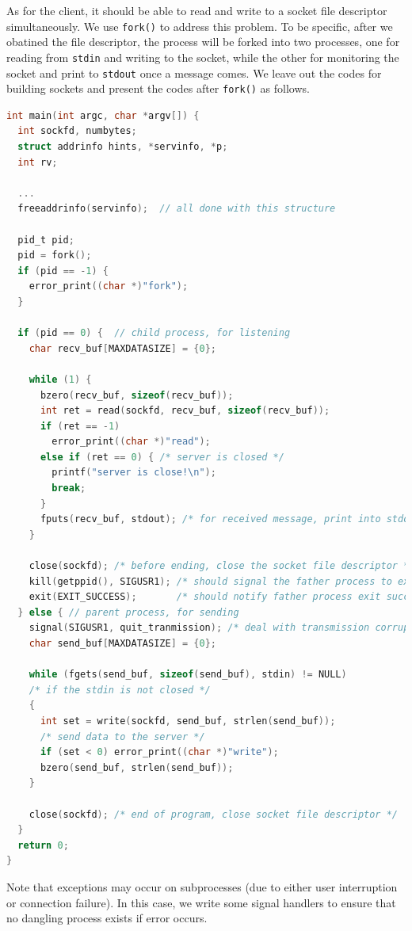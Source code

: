 \begin{exercise}[]
  As for the client, it should be able to read and write to a socket file descriptor simultaneously. We use \texttt{fork()} to address this problem. To be specific, after we obatined the file descriptor, the process will be forked into two processes, one for reading from \texttt{stdin} and writing to the socket, while the other for monitoring the socket and print to \texttt{stdout} once a message comes. We leave out the codes for building sockets and present the codes after \texttt{fork()} as follows.

\begin{lstlisting}[language=C]
int main(int argc, char *argv[]) {
  int sockfd, numbytes;
  struct addrinfo hints, *servinfo, *p;
  int rv;

  ...
  freeaddrinfo(servinfo);  // all done with this structure

  pid_t pid;
  pid = fork();
  if (pid == -1) {
    error_print((char *)"fork");
  }

  if (pid == 0) {  // child process, for listening
    char recv_buf[MAXDATASIZE] = {0};

    while (1) {
      bzero(recv_buf, sizeof(recv_buf));
      int ret = read(sockfd, recv_buf, sizeof(recv_buf));
      if (ret == -1)
        error_print((char *)"read");
      else if (ret == 0) { /* server is closed */
        printf("server is close!\n");
        break;
      }
      fputs(recv_buf, stdout); /* for received message, print into stdout */
    }

    close(sockfd); /* before ending, close the socket file descriptor */
    kill(getppid(), SIGUSR1); /* should signal the father process to exit */
    exit(EXIT_SUCCESS);       /* should notify father process exit success */
  } else { // parent process, for sending
    signal(SIGUSR1, quit_tranmission); /* deal with transmission corruption */
    char send_buf[MAXDATASIZE] = {0};

    while (fgets(send_buf, sizeof(send_buf), stdin) != NULL)
    /* if the stdin is not closed */
    {
      int set = write(sockfd, send_buf, strlen(send_buf));
      /* send data to the server */
      if (set < 0) error_print((char *)"write");
      bzero(send_buf, strlen(send_buf));
    }

    close(sockfd); /* end of program, close socket file descriptor */
  }
  return 0;
}
\end{lstlisting}

Note that exceptions may occur on subprocesses (due to either user interruption or connection failure). In this case, we write some signal handlers to ensure that no dangling process exists if error occurs.


\end{exercise}
